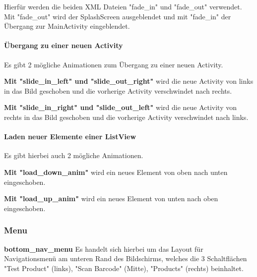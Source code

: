 \documentclass{scrartcl}
\begin{document}
\noindent Hierfür werden die beiden XML Dateien "fade\_in" und "fade\_out" verwendet. Mit "fade\_out" wird der SplashScreen ausgeblendet und mit "fade\_in" der Übergang zur MainActivity eingeblendet.

\paragraph{Übergang zu einer neuen Activity} \mbox{} \newline 

\noindent Es gibt 2 mögliche Animationen zum Übergang zu einer neuen Activity. \newline 

\noindent \textbf{Mit "slide\_in\_left" und "slide\_out\_right"} wird die neue Activity von links in das Bild geschoben und die vorherige Activity verschwindet nach rechts. \newline 

\noindent \textbf{Mit "slide\_in\_right" und "slide\_out\_left"} wird die neue Activity von rechts in das Bild geschoben und die vorherige Activity verschwindet nach links. \newline 

\newpage

\paragraph{Laden neuer Elemente einer ListView} \mbox{} \newline

\noindent Es gibt hierbei auch 2 mögliche Animationen. \newline 

\noindent \textbf{Mit "load\_down\_anim"} wird ein neues Element von oben nach unten eingeschoben. \newline 

\noindent \textbf{Mit "load\_up\_anim"} wird ein neues Element von unten nach oben eingeschoben. \newline 


\subsubsection{Menu}

\noindent \textbf{bottom\_nav\_menu \newline}
\noindent Es handelt sich hierbei um das Layout für Navigationsmenü am unteren Rand des Bildschirms, welches die 3 Schaltflächen "Test Product" (links), "Scan Barcode" (Mitte), "Products" (rechts) beinhaltet. \newline 
\end{document}
